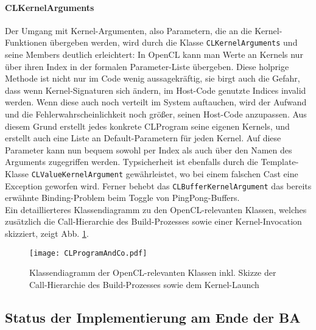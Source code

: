		\paragraph{CLKernelArguments}
		\label{sec:CLKernelArguments}
		Der Umgang mit Kernel-Argumenten, also Parametern, die an die Kernel-Funktionen übergeben werden, 
		wird durch die Klasse \lstinline|CLKernelArguments| und seine Members deutlich erleichtert:
		In OpenCL kann man Werte an Kernels nur über ihren Index in der formalen Parameter-Liste übergeben.
		Diese holprige Methode ist nicht nur im Code wenig aussagekräftig, sie birgt auch die Gefahr,
		dass wenn Kernel-Signaturen sich ändern, im Host-Code genutzte Indices invalid werden.
		Wenn diese auch noch verteilt im System auftauchen, wird der Aufwand und die Fehlerwahrscheinlichkeit noch größer,
		seinen Host-Code anzupassen. Aus diesem Grund erstellt jedes konkrete CLProgram seine eigenen Kernels,
		und erstellt auch eine Liste an Default-Parametern für jeden Kernel. Auf diese Parameter kann nun bequem
		sowohl per Index als auch über den Namen des Arguments zugegriffen werden. Typsicherheit ist ebenfalls
		durch die Template-Klasse \lstinline|CLValueKernelArgument| gewährleistet, wo bei einem falschen
		Cast eine Exception geworfen wird.
		Ferner behebt das \lstinline|CLBufferKernelArgument| das bereits erwähnte Binding-Problem 
		beim Toggle von PingPong-Buffers.\\
		Ein detaillierteres Klassendiagramm zu den OpenCL-relevanten Klassen,
		welches zusätzlich die Call-Hierarchie des Build-Prozesses sowie einer Kernel-Invocation skizziert,
		zeigt Abb. \ref{fig:OCLRelatedClassDiag}.
		
		\begin{figure}[t]
		\texttt{[image: CLProgramAndCo.pdf]}
		\caption{Klassendiagramm der OpenCL-relevanten Klassen inkl. Skizze der Call-Hierarchie des Build-Prozesses
		sowie dem Kernel-Launch}
		\label{fig:OCLRelatedClassDiag}
		\end{figure}



\subsection{Status der Implementierung am Ende der BA}
\label{sec:statusImplementation}

